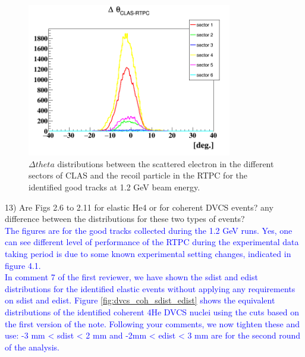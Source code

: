 \begin{figure}[tbp]
\centering
\includegraphics[height=6.7cm]{fig/delta_theta_sec.png}
\caption{$\Delta theta$ distributions between the scattered electron in the 
different sectors of CLAS and the recoil particle in the RTPC for the 
identified good tracks at 1.2 GeV beam energy.}
\label{fig:delta_theta_sec}
 \end{figure}



13) Are Figs 2.6 to 2.11 for elastic He4 or for coherent DVCS events? any 
difference between the distributions for these two types of events?\\
\textcolor{blue}{ The figures are for the good tracks collected during the 1.2 
GeV runs. Yes, one can see different level of performance of the RTPC during 
the experimental data taking period is due to some known experimental setting 
changes, indicated in figure 4.1.}\\
\textcolor{blue}{ In comment 7 of the first reviewer, we have shown the sdist 
   and edist distributions for the identified elastic events without applying 
   any requirements on sdist and edist. Figure \ref{fig:dvcs_coh_sdist_edist} 
   shows the equivalent distributions of the identified coherent 4He DVCS 
   nuclei using the cuts based on the first version of the note.
   Following your comments, we now tighten these and use: -3 mm < sdist < 2 mm 
   and -2mm < edist < 3 mm are for the second round of the analysis. }\\ 

